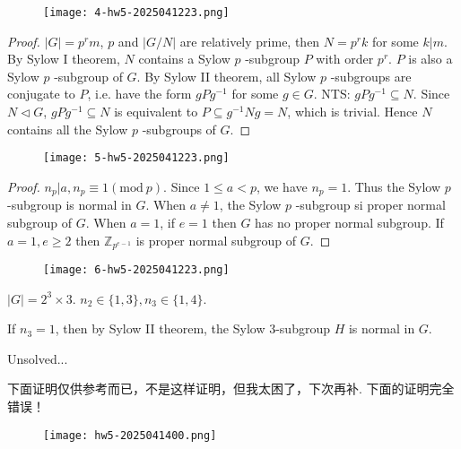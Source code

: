 \begin{figure}[H]
\centering
\texttt{[image: 4-hw5-2025041223.png]}
\label{}
\end{figure}

\begin{proof}
$\lvert G \rvert=p^{r}m$, $p$ and $\lvert G/N  \rvert$ are relatively prime, then $N=p^{r}k$ for some $k|m$. By Sylow I theorem, $N$ contains a Sylow $p$ -subgroup $P$ with order $p^{r}$. $P$ is also a Sylow $p$ -subgroup of $G$. By Sylow II theorem, all Sylow $p$ -subgroups are conjugate to $P$, i.e. have the form $gPg^{-1}$ for some $g\in G$. NTS: $gPg^{-1}\subseteq N$. Since $N\lhd G$, $gPg^{-1}\subseteq N$ is equivalent to $P\subseteq g^{-1}Ng=N$, which is trivial. Hence $N$ contains all the Sylow $p$ -subgroups of $G$.
\end{proof}
\begin{figure}[H]
\centering
\texttt{[image: 5-hw5-2025041223.png]}
\label{}
\end{figure}

\begin{proof}
$n_{p}|a, n_{p}\equiv1(\mathrm{mod}\ p)$. Since $1\leq a<p$, we have $n_{p}=1$. Thus the Sylow $p$ -subgroup is normal in $G$. When $a\neq1$, the Sylow $p$ -subgroup si proper normal subgroup of $G$. When $a=1$, if $e=1$ then $G$ has no proper normal subgroup. If $a=1,e\geq2$ then $\mathbb{Z}_{p^{e-1}}$ is proper normal subgroup of $G$.
\end{proof}
\begin{figure}[H]
\centering
\texttt{[image: 6-hw5-2025041223.png]}
\label{}
\end{figure}
$\lvert G \rvert=2^{3}\times3$. $n_2\in \{ 1,3 \}, n_3\in \{ 1,4 \}$.

If $n_3=1$, then by Sylow II theorem, the Sylow 3-subgroup $H$ is normal in $G$.

Unsolved...

\begin{note}
下面证明仅供参考而已，不是这样证明，但我太困了，下次再补. 下面的证明完全错误！
\begin{figure}[H]
\centering
\texttt{[image: hw5-2025041400.png]}
\label{}
\end{figure}
\end{note}